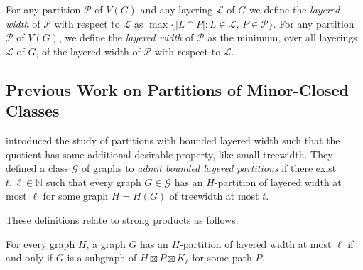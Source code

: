 \documentclass{patmorin}
\begin{document}
For any partition $\mathcal{P}$ of $V(G)$ and any layering $\mathcal{L}$ of $G$ we define the \emph{layered width} of $\mathcal{P}$ with respect to $\mathcal{L}$ as $\max\{|L\cap P|: L\in\mathcal{L},\, P\in\mathcal{P}\}$.  For any partition $\mathcal{P}$ of $V(G)$, we define the \emph{layered width} of $\mathcal{P}$ as the minimum, over all layerings $\mathcal{L}$ of $G$, of the layered width of $\mathcal{P}$ with respect to $\mathcal{L}$.





\subsection{Previous Work on Partitions of Minor-Closed Classes}

\citet{dujmovic.joret.ea:planar} introduced the study of partitions with bounded layered width such that the quotient has some additional desirable property, like small treewidth. 
They defined a class $\mathcal{G}$ of graphs to \emph{admit bounded layered partitions} if there exist $t,\ell\in\mathbb{N}$ such that every graph $G\in \mathcal{G}$ has an $H$-partition of layered width at most $\ell$ for some graph $H=H(G)$ of treewidth at most $t$.

These definitions relate to strong products as follows. 

\begin{lem} 
\label{PartitionProduct}
For every graph $H$, a graph $G$ has an $H$-partition of layered width at most $\ell$ if and only if $G$ is a subgraph of 
$H \boxtimes P \boxtimes K_\ell$ for some path $P$.
\end{lem}
\end{document}
